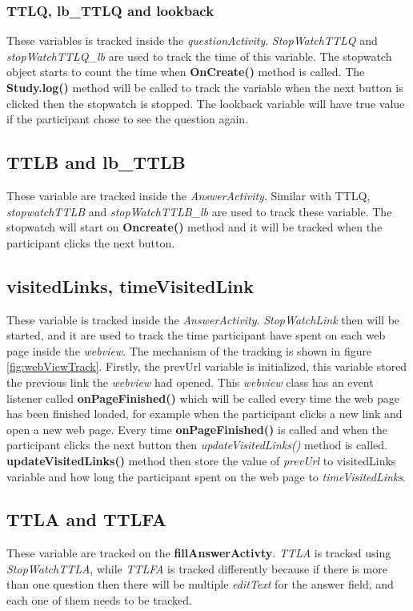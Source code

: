 \subsubsection{TTLQ, lb\_TTLQ and lookback}
These variables is tracked inside the \textit{questionActivity}.
\textit{StopWatchTTLQ} and \textit{stopWatchTTLQ\_lb} are used to track the time of this variable.
The stopwatch object starts to count the time when \textbf{OnCreate()} method is called.
The \textbf{Study.log()} method will be called to track the variable when the next button is clicked then the stopwatch is stopped.
The lookback variable will have true value if the participant chose to see the question again.

\subsection{TTLB and lb\_TTLB}
These variable are tracked inside the \textit{AnswerActivity}. Similar with TTLQ,
\textit{stopwatchTTLB} and \textit{stopWatchTTLB\_lb} are used to track these variable.
The stopwatch will start on \textbf{Oncreate()} method and it will be tracked when the participant clicks the next button.

\subsection{visitedLinks, timeVisitedLink}
These variable is tracked inside the \textit{AnswerActivity}.
\textit{StopWatchLink} then will be started, and it are used to track the time participant have spent on each web page inside the \textit{webview}.
The mechanism of the tracking is shown in figure \ref{fig:webViewTrack}. Firstly, the prevUrl variable is initialized,
this variable stored the previous link the \textit{webview} had opened. This \textit{webview} class has an event listener called \textbf{onPageFinished()}
 which will be called every time the web page has been finished loaded, for example when the participant clicks a new link and open a new web page.
  Every time \textbf{onPageFinished()} is called and when the participant clicks the next button then \textit{updateVisitedLinks()} method is called.
  \textbf{updateVisitedLinks()} method then store the value of \textit{prevUrl}
 to visitedLinks variable and how long the participant spent on the web page to \textit{timeVisitedLinks}.

\subsection{TTLA and TTLFA}
These variable are tracked on the \textbf{fillAnswerActivty}. \textit{TTLA} is tracked using \textit{StopWatchTTLA}, while
\textit{TTLFA} is tracked differently because if there is more than one question then there will be multiple \textit{editText} for the answer field, and
each one of them needs to be tracked.

